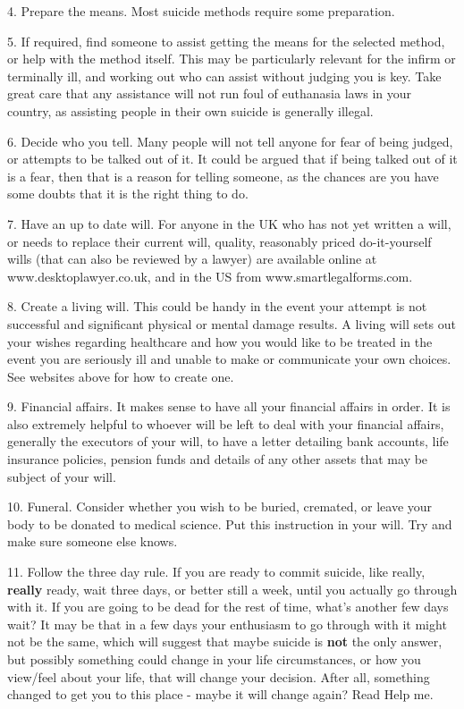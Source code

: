 \documentclass[12pt]{article}
\begin{document}
4. Prepare the means. Most suicide methods require some preparation.

5. If required, find someone to assist getting the means for the selected method, or help with the method itself. This may be particularly relevant for the infirm or terminally ill, and working out who can assist without judging you is key. Take great care that any assistance will not run foul of euthanasia laws in your country, as assisting people in their own suicide is generally illegal.

6. Decide who you tell. Many people will not tell anyone for fear of being judged, or attempts to be talked out of it. It could be argued that if being talked out of it is a fear, then that is a reason for telling someone, as the chances are you have some doubts that it is the right thing to do.

7. Have an up to date will. For anyone in the UK who has not yet written a will, or needs to replace their current will, quality, reasonably priced do-it-yourself wills (that can also be reviewed by a lawyer) are available online at www.desktoplawyer.co.uk, and in the US from www.smartlegalforms.com.

8. Create a living will. This could be handy in the event your attempt is not successful and significant physical or mental damage results. A living will sets out your wishes regarding healthcare and how you would like to be treated in the event you are seriously ill and unable to make or communicate your own choices. See websites above for how to create one.

9. Financial affairs. It makes sense to have all your financial affairs in order. It is also extremely helpful to whoever will be left to deal with your financial affairs, generally the executors of your will, to have a letter detailing bank accounts, life insurance policies, pension funds and details of any other assets that may be subject of your will.

10. Funeral. Consider whether you wish to be buried, cremated, or leave your body to be donated to medical science. Put this instruction in your will. Try and make sure someone else knows.

11. Follow the three day rule. If you are ready to commit suicide, like really, \textbf{really} ready, wait three days, or better still a week, until you actually go through with it. If you are going to be dead for the rest of time, what's another few days wait? It may be that in a few days your enthusiasm to go through with it might not be the same, which will suggest that maybe suicide is \textbf{not} the only answer, but possibly something could change in your life circumstances, or how you view/feel about your life, that will change your decision. After all, something changed to get you to this place - maybe it will change again? Read Help me.
\end{document}
